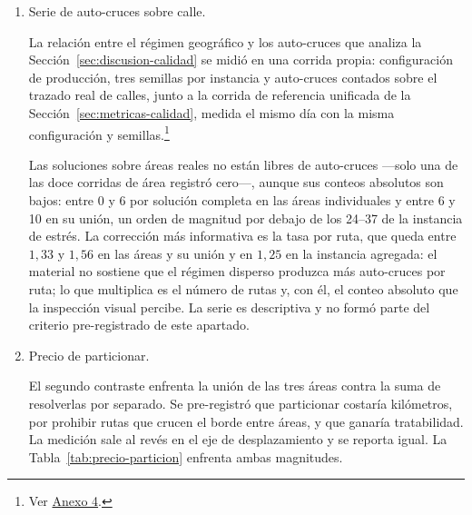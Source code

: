\begin{enumerate}
El mecanismo del relleno por $T_{\min}$ es general
(Sección~\ref{sec:discusion-calidad}): cuando $k \cdot T_{\min}$ excede holgadamente el trabajo real
de la instancia ---aquí $2 \times 7\,200 = 14\,400$\,s frente a los $10\,694$\,s que exige recorrer
los 72 árboles en una sola ruta---, partir y rellenar hasta el piso resulta más barato que una única
ruta que se pasa del objetivo superior. La palanca para este defecto ya se intentó por la vía de los
pisos (piso de paradas, piso combinado) y quedó cerrada sin cambio de \textit{default}.
\texttt{area-29} es el caso sin salida: 43 árboles no alcanzan para $7\,200$\,s, de modo que su
única ruta paga el piso porque no existe alternativa; \texttt{area-26} y la unión, en cambio,
quedan dentro de la banda $[7\,200,\ 9\,000]$ en que no se paga nada.

\item Serie de auto-cruces sobre calle.

La relación entre el régimen geográfico y los auto-cruces que analiza la
Sección~\ref{sec:discusion-calidad} se midió en una corrida propia: configuración de producción,
tres semillas por instancia y auto-cruces contados sobre el trazado real de calles, junto a la
corrida de referencia unificada de la Sección~\ref{sec:metricas-calidad}, medida el mismo día con
la misma configuración y semillas.\footnote{Ver \hyperref[anx:crossings-areas]{Anexo 4}.}

Las soluciones sobre áreas reales no están libres de auto-cruces ---solo una de las doce corridas
de área registró cero---, aunque sus conteos absolutos son bajos: entre 0 y 6 por solución
completa en las áreas individuales y entre 6 y 10 en su unión, un orden de magnitud por debajo de
los 24--37 de la instancia de estrés. La corrección
más informativa es la tasa por ruta, que queda entre $1{,}33$ y $1{,}56$ en las áreas y su unión y
en $1{,}25$ en la instancia agregada: el material no sostiene que el régimen disperso produzca más
auto-cruces por ruta; lo que multiplica es el número de rutas y, con él, el conteo absoluto que la
inspección visual percibe. La serie es descriptiva y no formó parte del criterio pre-registrado de
este apartado.

\item Precio de particionar.

El segundo contraste enfrenta la unión de las tres áreas contra la suma de resolverlas por separado.
Se pre-registró que particionar costaría kilómetros, por prohibir rutas que crucen el borde entre
áreas, y que ganaría tratabilidad. La medición sale al revés en el eje de desplazamiento y se
reporta igual. La Tabla~\ref{tab:precio-particion} enfrenta ambas magnitudes.


\end{enumerate}
